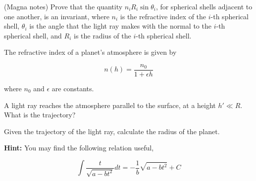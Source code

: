 \documentclass[11pt]{article}
\begin{document}
\begin{pproblem} (Magna notes)
    Prove that the quantity \(n_iR_i\sin \theta_i\), for spherical shells adjacent to one another, is an invariant, where \(n_i\) is the refractive index of the \(i\)-th spherical shell, \(\theta_i\) is the angle that the light ray makes with the normal to the \(i\)-th spherical shell, and \(R_i\) is the radius of the \(i\)-th spherical shell.
    
\end{pproblem}

\begin{pproblem}
    The refractive index of a planet's atmosphere is given by

    \[n(h) = \frac{n_0}{1+\epsilon h}\]

    where \(n_0\) and \(\epsilon\) are constants.

    \begin{alternativas}
        \item A light ray reaches the atmosphere parallel to the surface, at a height \(h'\ll R\). What is the trajectory?
        \item Given the trajectory of the light ray, calculate the radius of the planet.
    
        \textbf{Hint:} You may find the following relation useful,

        \[\int \frac{t}{\sqrt{a-bt^2}}dt = -\frac{1}{b}\sqrt{a-bt^2}+C\]
    \end{alternativas}

\end{pproblem}
\end{document}
